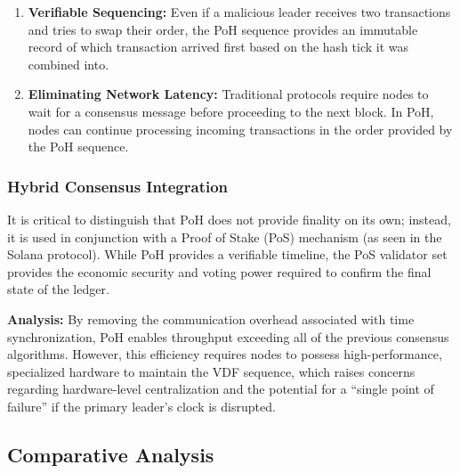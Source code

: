 \begin{enumerate}
    \item \textbf{Verifiable Sequencing:} Even if a malicious leader receives two transactions and tries to swap their order, the PoH sequence provides an immutable record of which transaction arrived first based on the hash tick it was combined into.
    \item \textbf{Eliminating Network Latency:} Traditional protocols require nodes to wait for a consensus message before proceeding to the next block. In PoH, nodes can continue processing incoming transactions in the order provided by the PoH sequence.
\end{enumerate}


\subsubsection{Hybrid Consensus Integration}
It is critical to distinguish that PoH does not provide finality on its own; instead, it is used in conjunction with a Proof of Stake (PoS) mechanism (as seen in the Solana protocol). While PoH provides a verifiable timeline, the PoS validator set provides the economic security and voting power required to confirm the final state of the ledger.

\textbf{Analysis:}
By removing the communication overhead associated with time synchronization, PoH enables throughput exceeding all of the previous consensus algorithms. However, this efficiency requires nodes to possess high-performance, specialized hardware to maintain the VDF sequence, which raises concerns regarding hardware-level centralization and the potential for a \enquote{single point of failure} if the primary leader’s clock is disrupted.


\subsection{Comparative Analysis} \label{ch2_comparison}

